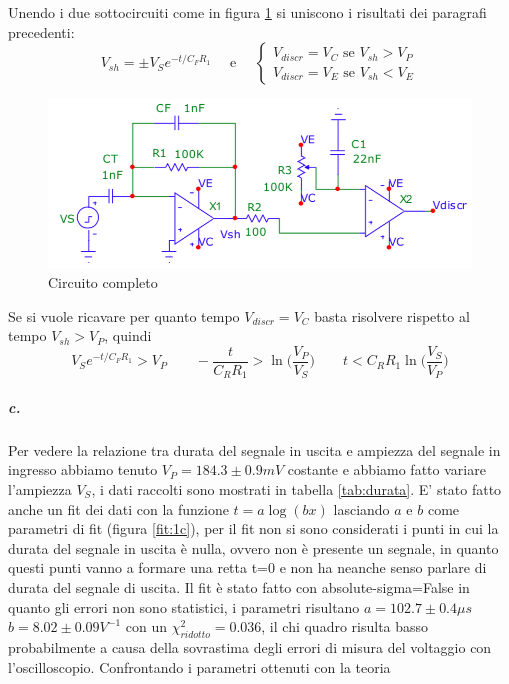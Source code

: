 \documentclass{article}
\begin{document}
	Unendo i due sottocircuiti come in figura \ref{fig:circ} si uniscono i risultati dei paragrafi precedenti:
	\begin{equation}
	V_{sh}=\pm V_Se^{-t/C_FR_1}\quad \textrm{ e }\quad 
	\begin{cases}
	V_{discr}=V_C \textrm{ se } V_{sh}>V_P\\
	V_{discr}=V_E \textrm{ se } V_{sh}<V_E
	\end{cases}
	\end{equation}
	\begin{figure}
		\label{fig:circ}
		\centering
		\includegraphics[width=0.7\linewidth]{immagini/circa.png}
		\caption{Circuito completo}
	\end{figure}
	Se si vuole ricavare per quanto tempo $V_{discr}=V_C$ basta risolvere rispetto al tempo $V_{sh}>V_P$, quindi
	\begin{equation}
	V_Se^{-t/C_FR_1}>V_P\qquad-\frac{t}{C_RR_1}>\ln \bigg(\frac{V_P}{V_S}\bigg)\qquad t<C_RR_1\ln \bigg(\frac{V_S}{V_P}\bigg)
	\end{equation}
	
	\subparagraph{c.}
	Per vedere la relazione tra durata del segnale in uscita e ampiezza del segnale in ingresso abbiamo tenuto $V_P=184.3\pm0.9 mV$ costante e abbiamo fatto variare l'ampiezza $V_S$, i dati raccolti sono mostrati in tabella \ref{tab:durata}. E' stato fatto anche un fit dei dati con la funzione $t=a \log(bx)$ lasciando $a$ e $b$ come parametri di fit (figura \ref{fit:1c}), per il fit non si sono considerati i punti in cui la durata del segnale in uscita è nulla, ovvero non è presente un segnale, in quanto questi punti vanno a formare una retta t=0 e non ha neanche senso parlare di durata del segnale di uscita. Il fit  è stato fatto con absolute-sigma=False in quanto gli errori non sono statistici, i parametri risultano $a=102.7\pm0.4 \mu s$ $b=8.02\pm0.09 V^{-1}$ con un $\chi^2_{ridotto}=0.036$, il chi quadro risulta basso probabilmente a causa della sovrastima degli errori di misura del voltaggio con l'oscilloscopio. Confrontando i parametri ottenuti con la teoria 
	
\end{document}
